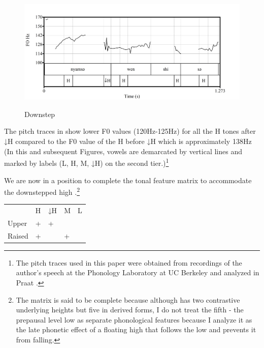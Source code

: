 \documentclass[output=paper,modfonts,nonflat,
colorlinks, citecolor=brown,
]{langsci/langscibook}
\begin{document}
\ea\label{ex:akumbu:20}
\z

\begin{figure}[t]
	{\includegraphics[width=\textwidth]{figures/fig-akumbu-1}}
	\caption{Downstep}\label{fig:akumbu:1}	
\end{figure}

\largerpage[-1]
The pitch traces in  show lower F0 values (120Hz-125Hz) for all the H tones after ↓H compared to the F0 value of the H  before ↓H which is approximately 138Hz (In this and subsequent Figures, vowels are demarcated by vertical lines and marked by  labels (L, H, M, ↓H) on the second tier.)\footnote{The pitch traces used in this paper were obtained from recordings of the author’s speech at the Phonology Laboratory at UC Berkeley and analyzed in Praat \citep{Boersma2016}.}


We are now in a position to complete the tonal feature matrix to accommodate the downstepped high .\footnote{The matrix is said to be complete because although  has two contrastive underlying  heights but five in derived forms, I do not treat the fifth - the prepausal level low  as separate phonological  features because I analyze it as the late phonetic effect of a floating high  that follows the low  and prevents it from falling.} 

\ea\label{ex:akumbu:21}
\begin{tabular}[t]{lllll}
	&			H&	↓H&	M&	L\\
	Upper&		+&	+&	\textminus&	\textminus\\
	Raised&		+&	\textminus&	+&	\textminus\\
\end{tabular}
\z
\end{document}

